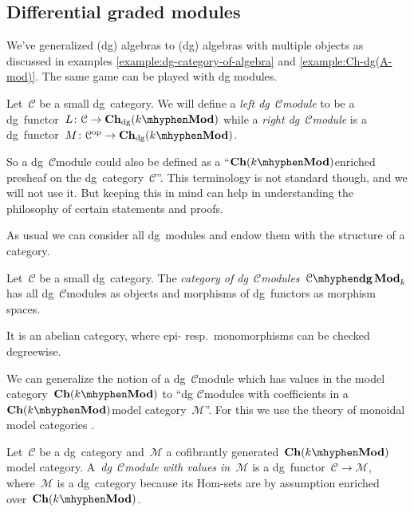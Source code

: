 \begin{refsection}
\section{Differential graded modules}
We've generalized (dg) algebras to (dg) algebras with multiple objects as discussed in examples \ref{example:dg-category-of-algebra} and \ref{example:Ch-dg(A-mod)}. The same game can be played with dg modules.

\begin{definition}
  Let~$\mathcal{C}$ be a small dg~category. We will define a \emph{left dg~$\mathcal{C}$\dash module} to be a dg~functor~$L\colon\mathcal{C}\to\Ch_\dg(k\mhyphen\Mod)$ while a \emph{right dg~$\mathcal{C}$\dash module} is a dg~functor~$M\colon\mathcal{C}^\opp\to\Ch_\dg(k\mhyphen\Mod)$.
\end{definition}
So a dg~$\mathcal{C}$\dash module could also be defined as a ``$\Ch(k\mhyphen\Mod)$\dash enriched presheaf on the dg~category~$\mathcal{C}$''. This terminology is not standard though, and we will not use it. But keeping this in mind can help in understanding the philosophy of certain statements and proofs.

As usual we can consider all dg~modules and endow them with the structure of a category.
\begin{definition}
  \label{definition:category-of-dg-modules}
  Let~$\mathcal{C}$ be a small dg~category. The \emph{category of dg~$\mathcal{C}$\dash modules}~$\dgMod{\mathcal{C}}_k$ has all dg~$\mathcal{C}$\dash modules as objects and morphisms of dg~functors as morphism spaces. 
\end{definition}
It is an abelian category, where epi- resp.\ monomorphisms can be checked degreewise.

We can generalize the notion of a dg~$\mathcal{C}$\dash module which has values in the model category~$\Ch(k\mhyphen\Mod)$ to ``dg $\mathcal{C}$\dash modules with coefficients in a~$\Ch(k\mhyphen\Mod)$\dash model category~$\mathcal{M}$''. For this we use the theory of monoidal model categories \cite[section 4.2]{hovey}.
\begin{definition}
  \label{definition:C-dgMod(M)}
  Let~$\mathcal{C}$ be a dg~category and~$\mathcal{M}$ a cofibrantly generated~$\Ch(k\mhyphen\Mod)$\dash model category. A~\emph{dg~$\mathcal{C}$\dash module with values in~$\mathcal{M}$} is a dg~functor~$\mathcal{C}\to\mathcal{M}$, where~$\mathcal{M}$ is a dg~category because its Hom-sets are by assumption enriched over~$\Ch(k\mhyphen\Mod)$.
  

\end{definition}
\end{refsection}
